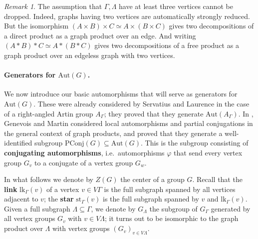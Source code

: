 \documentclass[a4paper,english,11pt]{article}
\theoremstyle{definition}
\theoremstyle{remark}
\newtheorem{rk}[de]{Remark}
\newcommand{\st}{\mathrm{st}}
\newcommand{\lk}{\mathrm{lk}}
\newcommand{\Aut}{\mathrm{Aut}}
\newcommand{\PConj}{\mathrm{PConj}}
\newcommand{\deffont}[1]{\textbf{#1}}
\begin{document}
\begin{rk}\label{Rq:at-least-three-vertices}
The assumption that $\Gamma,\Lambda$ have at least three vertices cannot be dropped. Indeed, graphs having two vertices are automatically strongly reduced. But the isomorphism $(A\times B)\times C\simeq A\times (B\times C)$ gives two decompositions of a direct product as a graph product over an edge. And writing $(A\ast B)\ast C\simeq A\ast (B\ast C)$ gives two decompositions of a free product as a graph product over an edgeless graph with two vertices.
\end{rk}

\paragraph{Generators for $\Aut(G)$.}

We now introduce our basic automorphisms that will serve as generators for $\Aut(G)$. These were already considered by Servatius \cite{Ser} and Laurence \cite{Lau} in the case of a right-angled Artin group $A_\Gamma$; they proved that they generate $\Aut(A_\Gamma)$. In \cite{GM}, Genevois and Martin considered local automorphisms and partial conjugations in the general context of graph products, and proved that they generate a well-identified subgroup $\PConj(G)\subseteq \Aut(G)$. This is the subgroup consisting of \deffont{conjugating automorphisms}, i.e.\ automorphisms $\varphi$ that send every vertex group $G_v$ to a conjugate of a vertex group $G_w$. 

In what follows we denote by $Z(G)$ the center of a group $G$. Recall that the \deffont{link} $\lk_\Gamma(v)$ of a vertex $v\in V\Gamma$ is the full subgraph spanned by all vertices adjacent to $v$; the \deffont{star} $\st_\Gamma(v)$ is the full subgraph spanned by $v$ and $\lk_\Gamma(v)$. Given a full subgraph $\Lambda\subseteq\Gamma$, we denote by $G_\Lambda$ the subgroup of $G_\Gamma$ generated by all vertex groups $G_v$ with $v\in V\Lambda$; it turns out to be isomorphic to the graph product over $\Lambda$ with vertex groups $(G_v)_{v\in V\Lambda}$.
\end{document}
